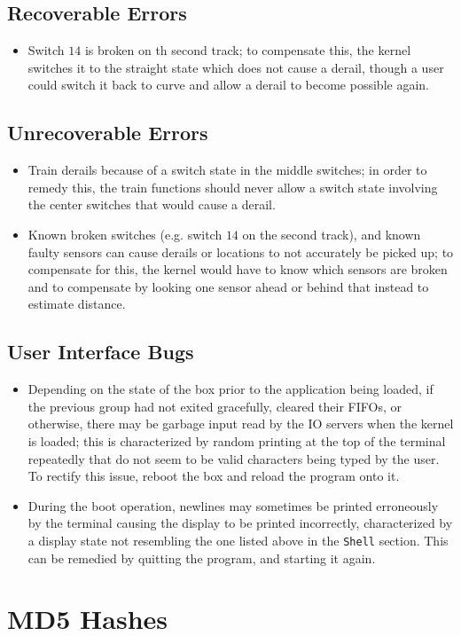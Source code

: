 \documentclass[12pt]{article}
\begin{document}
\subsection{Recoverable Errors}
\begin{itemize}
  \item Switch $14$ is broken on th second track; to compensate this, the kernel switches it to the straight state which does not cause a derail, though a user could switch it back to curve and allow a derail to become possible again.
\end{itemize}
\subsection{Unrecoverable Errors}
\begin{itemize}
  \item Train derails because of a switch state in the middle switches; in order to remedy this, the train functions should never allow a switch state involving the center switches that would cause a derail.
  \item Known broken switches (e.g. switch $14$ on the second track), and known faulty sensors can cause derails or locations to not accurately be picked up; to compensate for this, the kernel would have to know which sensors are broken and to compensate by looking one sensor ahead or behind that instead to estimate distance.
\end{itemize}
\subsection{User Interface Bugs}
\begin{itemize}
  \item Depending on the state of the box prior to the application being loaded, if the previous group had not exited gracefully, cleared their FIFOs, or otherwise, there may be garbage input read by the IO servers when the kernel is loaded; this is characterized by random printing at the top of the terminal repeatedly that do not seem to be valid characters being typed by the user.  To rectify this issue, reboot the box and reload the program onto it.
  \item During the boot operation, newlines may sometimes be printed erroneously by the terminal causing the display to be printed incorrectly, characterized by a display state not resembling the one listed above in the \texttt{Shell} section.  This can be remedied by quitting the program, and starting it again.
\\[2\baselineskip]
\end{itemize}
\section{MD5 Hashes}

\end{document}

